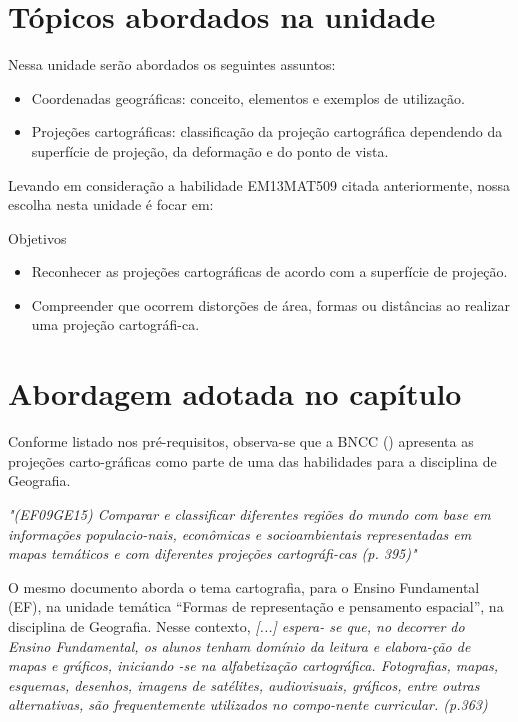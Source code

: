 \begin{apresentacao}
{\section*{Tópicos abordados na unidade}
Nessa unidade serão abordados os seguintes assuntos:
\begin{itemize}
\item Coordenadas geográficas: conceito, elementos e exemplos de utilização.
\item Projeções cartográficas: classificação da projeção cartográfica dependendo da superfície de projeção, da deformação e do ponto de vista.
\end{itemize}
	

Levando em consideração a habilidade EM13MAT509 citada anteriormente, nossa escolha nesta unidade é focar em:
\begin{objetivos}{Objetivos}
\begin{itemize}
\item Reconhecer as projeções cartográficas de acordo com a superfície de projeção.
\item Compreender que ocorrem distorções de área, formas ou distâncias ao realizar uma projeção cartográfi-ca. 
\end{itemize}
\end{objetivos}

\section*{Abordagem adotada no capítulo}

Conforme listado nos pré-requisitos, observa-se que a BNCC (\cite{BNCC2018}) apresenta as projeções carto-gráficas como parte de uma das habilidades para a disciplina de Geografia.

\textit{"(EF09GE15) Comparar e classificar diferentes regiões do mundo com base em informações populacio-nais, econômicas e socioambientais representadas em mapas temáticos e com diferentes projeções cartográfi-cas (p. 395)"}

O mesmo documento aborda o tema cartografia, para o Ensino Fundamental (EF), na unidade temática “Formas de representação e pensamento espacial”, na disciplina de Geografia. Nesse contexto, 
\textit{[...] espera- se que, no decorrer do Ensino Fundamental, os alunos tenham domínio da leitura e elabora-ção de mapas e gráficos, iniciando -se na alfabetização cartográfica. Fotografias, mapas, esquemas, desenhos, imagens de satélites, audiovisuais, gráficos, entre outras alternativas, são frequentemente utilizados no compo-nente curricular. (p.363)}

}
\end{apresentacao}
